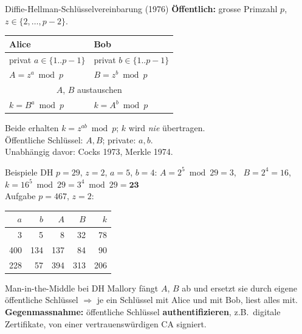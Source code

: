 \documentclass[a4paper, fontsize=7pt]{scrartcl}
\renewcommand*{\arraystretch}{1.5}  %
\begin{document}
\begin{mainbox}{Diffie-Hellman-Schlüsselvereinbarung (1976)}
\textbf{Öffentlich:} grosse Primzahl $p$, $z \in \{2, \ldots, p-2\}$.
\renewcommand*{\arraystretch}{1.25}
\begin{center}
\begin{tabular}{l|l}
\textbf{Alice} & \textbf{Bob} \\
\hline
privat $a \in \{1..p{-}1\}$ & privat $b \in \{1..p{-}1\}$ \\
$A = z^a \bmod p$ & $B = z^b \bmod p$ \\
\multicolumn{2}{c}{$A$, $B$ austauschen} \\
$k = B^a \bmod p$ & $k = A^b \bmod p$ \\
\end{tabular}
\end{center}
Beide erhalten $\boxed{k = z^{ab} \bmod p}$; $k$ wird \emph{nie} übertragen.\\
Öffentliche Schlüssel: $A, B$; private: $a, b$.\\
Unabhängig davor: Cocks 1973, Merkle 1974.
\end{mainbox}

\begin{subbox}{Beispiele DH}
$p = 29$, $z = 2$, $a = 5$, $b = 4$:
$A = 2^5 \bmod 29 = 3$, \ $B = 2^4 = 16$,\\
$k = 16^5 \bmod 29 = 3^4 \bmod 29 = \mathbf{23}$\\[2pt]
Aufgabe $p = 467$, $z = 2$:
\renewcommand*{\arraystretch}{1.1}
\begin{center}
\begin{tabular}{rr|rr|r}
$a$ & $b$ & $A$ & $B$ & $k$ \\
\hline
3 & 5 & 8 & 32 & 78 \\
400 & 134 & 137 & 84 & 90 \\
228 & 57 & 394 & 313 & 206 \\
\end{tabular}
\end{center}
\end{subbox}

\begin{mainbox}{Man-in-the-Middle bei DH}
Mallory fängt $A$, $B$ ab und ersetzt sie durch eigene öffentliche Schlüssel
$\Rightarrow$ je ein Schlüssel mit Alice und mit Bob, liest alles mit.\\
\textbf{Gegenmassnahme:} öffentliche Schlüssel \textbf{authentifizieren}, z.B.\
digitale Zertifikate, von einer vertrauenswürdigen CA signiert.
\end{mainbox}
\end{document}

